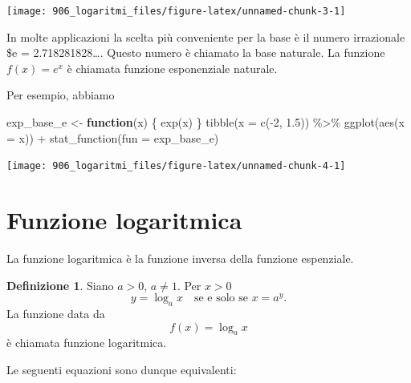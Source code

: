\documentclass[
]{memoir}
\newenvironment{Shaded}{\begin{snugshade}}{\end{snugshade}}
\newcommand{\AttributeTok}[1]{\textcolor[rgb]{0.77,0.63,0.00}{#1}}
\newcommand{\ControlFlowTok}[1]{\textcolor[rgb]{0.13,0.29,0.53}{\textbf{#1}}}
\newcommand{\DecValTok}[1]{\textcolor[rgb]{0.00,0.00,0.81}{#1}}
\newcommand{\FloatTok}[1]{\textcolor[rgb]{0.00,0.00,0.81}{#1}}
\newcommand{\FunctionTok}[1]{\textcolor[rgb]{0.00,0.00,0.00}{#1}}
\newcommand{\NormalTok}[1]{#1}
\newcommand{\OtherTok}[1]{\textcolor[rgb]{0.56,0.35,0.01}{#1}}
\newcommand{\SpecialCharTok}[1]{\textcolor[rgb]{0.00,0.00,0.00}{#1}}
\theoremstyle{definition}
\newtheorem{definition}{Definizione}[chapter]
\theoremstyle{definition}
\theoremstyle{definition}
\theoremstyle{definition}
\theoremstyle{remark}
\begin{document}
\begin{center}\texttt{[image: 906\_logaritmi\_files/figure-latex/unnamed-chunk-3-1]} \end{center}

In molte applicazioni la scelta più conveniente per la base è il numero irrazionale \$e = 2.718281828\dots. Questo numero è chiamato la base naturale. La funzione \(f(x) = e^x\) è chiamata funzione esponenziale naturale.

Per esempio, abbiamo

\begin{Shaded}
\begin{Highlighting}[]
\NormalTok{exp\_base\_e }\OtherTok{\textless{}{-}} \ControlFlowTok{function}\NormalTok{(x) \{}
  \FunctionTok{exp}\NormalTok{(x)}
\NormalTok{\}}
\FunctionTok{tibble}\NormalTok{(}\AttributeTok{x =} \FunctionTok{c}\NormalTok{(}\SpecialCharTok{{-}}\DecValTok{2}\NormalTok{, }\FloatTok{1.5}\NormalTok{)) }\SpecialCharTok{\%\textgreater{}\%}
  \FunctionTok{ggplot}\NormalTok{(}\FunctionTok{aes}\NormalTok{(}\AttributeTok{x =}\NormalTok{ x)) }\SpecialCharTok{+}
  \FunctionTok{stat\_function}\NormalTok{(}\AttributeTok{fun =}\NormalTok{ exp\_base\_e)}
\end{Highlighting}
\end{Shaded}

\begin{center}\texttt{[image: 906\_logaritmi\_files/figure-latex/unnamed-chunk-4-1]} \end{center}

\hypertarget{funzione-logaritmica}{%
\section{Funzione logaritmica}\label{funzione-logaritmica}}

La funzione logaritmica è la funzione inversa della funzione espenziale.

\begin{definition}
Siano \(a > 0\), \(a \neq 1\). Per \(x > 0\)
\begin{equation}
y = \log_a x \quad \text{se e solo se } x = a^y.
\end{equation}
\noindent
La funzione data da
\begin{equation}
f(x) = \log_a x
\end{equation}
\noindent
è chiamata funzione logaritmica.
\end{definition}

Le seguenti equazioni sono dunque equivalenti:
\end{document}
